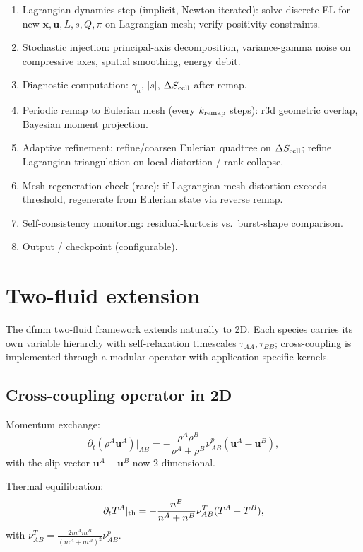 \documentclass[11pt]{article}
\newcommand{\bx}{\bm{x}}
\newcommand{\bu}{\bm{u}}
\begin{document}
\begin{enumerate}
\item Lagrangian dynamics step (implicit, Newton-iterated):
solve discrete EL for new $\bx, \bu, L, s, Q, \pi$ on Lagrangian
mesh; verify positivity constraints.
\item Stochastic injection: principal-axis decomposition, variance-gamma
noise on compressive axes, spatial smoothing, energy debit.
\item Diagnostic computation: $\gamma_a$, $|s|$, $\Delta S_{\rm cell}$
after remap.
\item Periodic remap to Eulerian mesh (every $k_{\rm remap}$ steps):
r3d geometric overlap, Bayesian moment projection.
\item Adaptive refinement: refine/coarsen Eulerian quadtree on
$\Delta S_{\rm cell}$; refine Lagrangian triangulation on local
distortion / rank-collapse.
\item Mesh regeneration check (rare): if Lagrangian mesh distortion
exceeds threshold, regenerate from Eulerian state via reverse remap.
\item Self-consistency monitoring: residual-kurtosis vs.\
burst-shape comparison.
\item Output / checkpoint (configurable).
\end{enumerate}

\section{Two-fluid extension}
\label{sec:two-fluid}

The dfmm two-fluid framework extends naturally to 2D. Each species
carries its own variable hierarchy with self-relaxation timescales
$\tau_{AA}, \tau_{BB}$; cross-coupling is implemented through a
modular operator with application-specific kernels.

\subsection{Cross-coupling operator in 2D}

Momentum exchange:
\begin{equation}
  \partial_t(\rho^A\bu^A)|_{AB} = -\frac{\rho^A\rho^B}{\rho^A + \rho^B}\nu^p_{AB}(\bu^A - \bu^B),
\end{equation}
with the slip vector $\bu^A - \bu^B$ now 2-dimensional.

Thermal equilibration:
\begin{equation}
  \partial_t T^A|_{\rm th} = -\frac{n^B}{n^A+n^B}\nu^T_{AB}(T^A - T^B),
\end{equation}
with $\nu^T_{AB} = \frac{2 m^A m^B}{(m^A+m^B)^2}\nu^p_{AB}$.
\end{document}
